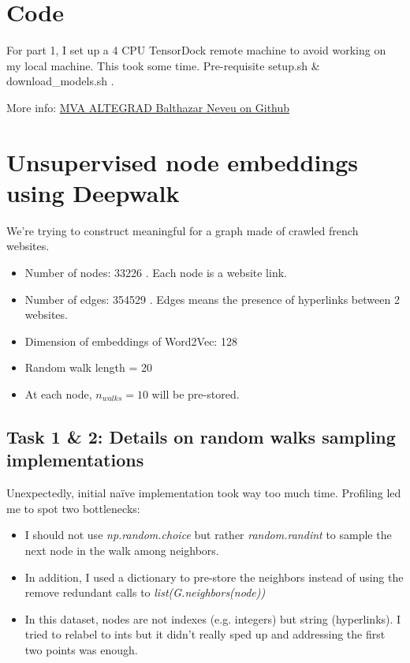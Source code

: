 \documentclass[a4paper]{article}
\begin{document}

\section*{Code}
For part 1, I set up a 4 CPU TensorDock remote machine to avoid working on my local machine.
This took some time. Pre-requisite setup.sh \& download\_models.sh .

More info:
\href{https://github.com/balthazarneveu/MVA23_ALTEGRAD/#readme}{MVA ALTEGRAD Balthazar Neveu on Github}

\section{Unsupervised node embeddings using Deepwalk}

We're trying to construct meaningful for a graph made of crawled french websites.

\begin{itemize}
    \item Number of nodes: 33226 . Each node is a website link.
    \item Number of edges: 354529 . Edges means the presence of hyperlinks between 2 websites.
    \item Dimension of embeddings of Word2Vec: 128
    \item Random walk length = 20
    \item At each node, $n_{walks}=10$ will be pre-stored.
\end{itemize}

\subsection*{Task 1 \& 2: Details on random walks sampling implementations}
Unexpectedly, initial naïve implementation took way too much time. 
Profiling led me to spot two bottlenecks:
\begin{itemize}
    \item I should not use \textit{np.random.choice} but rather \textit{random.randint} 
    to sample the next node in the walk
among neighbors.
    \item In addition, I used a dictionary to pre-store the neighbors instead of using the remove redundant calls to \textit{list(G.neighbors(node))}
    \item In this dataset, nodes are not indexes (e.g. integers) but string (hyperlinks).
    I tried to relabel to ints but it didn't really sped up and addressing the first two points was enough.
\end{itemize}
\end{document}
